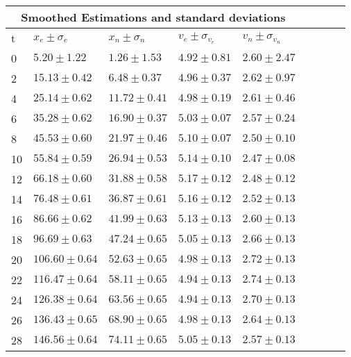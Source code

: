 \begin{table}[h] 
   \begin{center} 
      \begin{tabular}{lllllllll}\toprule 
\multicolumn{5}{c}{Smoothed Estimations and standard deviations}\\ 
\midrule 
t&  $x_e \pm \sigma_e$& $x_n \pm \sigma_n$& $v_e \pm \sigma_{v_e}$& $v_n \pm \sigma_{v_n}$\\ \midrule 
0 & $    5.20 \pm     1.22$ & $    1.26 \pm     1.53$ & $    4.92 \pm     0.81$ & $    2.60 \pm     2.47$  \\ 
2 & $   15.13 \pm     0.42$ & $    6.48 \pm     0.37$ & $    4.96 \pm     0.37$ & $    2.62 \pm     0.97$  \\ 
4 & $   25.14 \pm     0.62$ & $   11.72 \pm     0.41$ & $    4.98 \pm     0.19$ & $    2.61 \pm     0.46$  \\ 
6 & $   35.28 \pm     0.62$ & $   16.90 \pm     0.37$ & $    5.03 \pm     0.07$ & $    2.57 \pm     0.24$  \\ 
8 & $   45.53 \pm     0.60$ & $   21.97 \pm     0.46$ & $    5.10 \pm     0.07$ & $    2.50 \pm     0.10$  \\ 
10 & $   55.84 \pm     0.59$ & $   26.94 \pm     0.53$ & $    5.14 \pm     0.10$ & $    2.47 \pm     0.08$  \\ 
12 & $   66.18 \pm     0.60$ & $   31.88 \pm     0.58$ & $    5.17 \pm     0.12$ & $    2.48 \pm     0.12$  \\ 
14 & $   76.48 \pm     0.61$ & $   36.87 \pm     0.61$ & $    5.16 \pm     0.12$ & $    2.52 \pm     0.13$  \\ 
16 & $   86.66 \pm     0.62$ & $   41.99 \pm     0.63$ & $    5.13 \pm     0.13$ & $    2.60 \pm     0.13$  \\ 
18 & $   96.69 \pm     0.63$ & $   47.24 \pm     0.65$ & $    5.05 \pm     0.13$ & $    2.66 \pm     0.13$  \\ 
20 & $  106.60 \pm     0.64$ & $   52.63 \pm     0.65$ & $    4.98 \pm     0.13$ & $    2.72 \pm     0.13$  \\ 
22 & $  116.47 \pm     0.64$ & $   58.11 \pm     0.65$ & $    4.94 \pm     0.13$ & $    2.74 \pm     0.13$  \\ 
24 & $  126.38 \pm     0.64$ & $   63.56 \pm     0.65$ & $    4.94 \pm     0.13$ & $    2.70 \pm     0.13$  \\ 
26 & $  136.43 \pm     0.65$ & $   68.90 \pm     0.65$ & $    4.98 \pm     0.13$ & $    2.64 \pm     0.13$  \\ 
28 & $  146.56 \pm     0.64$ & $   74.11 \pm     0.65$ & $    5.05 \pm     0.13$ & $    2.57 \pm     0.13$  \\ 

\end{tabular}
\end{center}
\end{table}
